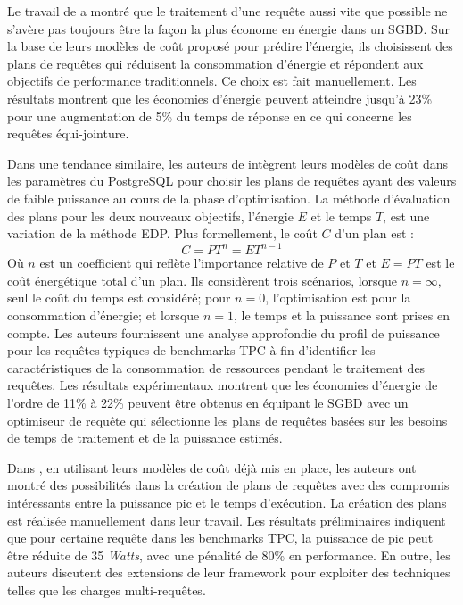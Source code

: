 Le travail de \cite{Lang11} a montré que le traitement d'une requête aussi vite que possible ne s'avère pas toujours être la façon la plus économe en énergie dans un SGBD. Sur la base de leurs modèles de coût proposé pour prédire l'énergie, ils choisissent des plans de requêtes qui réduisent la consommation d'énergie et répondent aux objectifs de performance traditionnels. Ce choix est fait manuellement. Les résultats montrent que les économies d'énergie peuvent atteindre jusqu'à 23\% pour une augmentation de 5\% du temps de réponse en ce qui concerne les requêtes équi-jointure.

Dans une tendance similaire, les auteurs de \cite{Xu10b} intègrent leurs modèles de coût dans les paramètres du PostgreSQL pour choisir les plans de requêtes ayant des valeurs de faible puissance au cours de la phase d'optimisation. La méthode d’évaluation des plans pour les deux nouveaux objectifs, l'énergie $E$ et le temps $T$, est une variation de la méthode EDP. Plus formellement, le coût $C$ d'un plan est :
\begin{equation}
 C = PT^n = ET^{n-1}
\end{equation}
Où $n$ est un coefficient qui reflète l'importance relative de $P$ et $T$ et $E = PT$ est le coût énergétique total d'un plan. Ils considèrent trois scénarios, lorsque $n = \infty$, seul le coût du temps est considéré; pour $n = 0$, l'optimisation est pour la consommation d'énergie; et lorsque $n = 1$, le temps et la puissance sont prises en compte.
Les auteurs fournissent une analyse approfondie du profil de puissance pour les requêtes typiques de benchmarks TPC à fin d'identifier les caractéristiques de la consommation de ressources pendant le traitement des requêtes. Les résultats expérimentaux montrent que les économies d'énergie de l'ordre de 11\% à 22\% peuvent être obtenus en équipant le SGBD avec un optimiseur de requête qui sélectionne les plans de requêtes basées sur les besoins de temps de traitement et de la puissance estimés.

Dans \cite{Kunjir12}, en utilisant leurs modèles de coût déjà mis en place, les auteurs ont montré des possibilités dans la création de plans de requêtes avec des compromis intéressants entre la puissance pic et le temps d'exécution. La création des plans est réalisée manuellement dans leur travail. Les résultats préliminaires indiquent que pour certaine requête dans les benchmarks TPC, la puissance de pic peut être réduite de 35 \textit{Watts}, avec une pénalité de 80\% en performance. En outre, les auteurs discutent des extensions de leur framework pour exploiter des techniques telles que les charges multi-requêtes.

